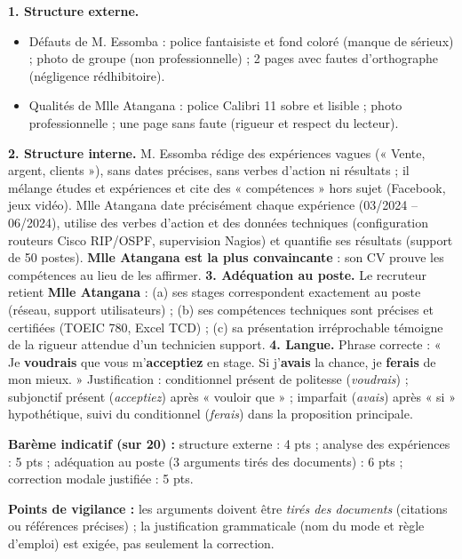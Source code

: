 \documentclass[11pt]{article}
\begin{document}
\begin{corrige}
\textbf{1. Structure externe.}
\begin{itemize}
\item Défauts de M. Essomba : police fantaisiste et fond coloré (manque de sérieux) ; photo de groupe (non professionnelle) ; 2 pages avec fautes d'orthographe (négligence rédhibitoire).
\item Qualités de Mlle Atangana : police Calibri 11 sobre et lisible ; photo professionnelle ; une page sans faute (rigueur et respect du lecteur).
\end{itemize}
\textbf{2. Structure interne.} M. Essomba rédige des expériences vagues (« Vente, argent, clients »), sans dates précises, sans verbes d'action ni résultats ; il mélange études et expériences et cite des « compétences » hors sujet (Facebook, jeux vidéo). Mlle Atangana date précisément chaque expérience (03/2024 -- 06/2024), utilise des verbes d'action et des données techniques (configuration routeurs Cisco RIP/OSPF, supervision Nagios) et quantifie ses résultats (support de 50 postes). \textbf{Mlle Atangana est la plus convaincante} : son CV prouve les compétences au lieu de les affirmer.
\textbf{3. Adéquation au poste.} Le recruteur retient \textbf{Mlle Atangana} : (a) ses stages correspondent exactement au poste (réseau, support utilisateurs) ; (b) ses compétences techniques sont précises et certifiées (TOEIC 780, Excel TCD) ; (c) sa présentation irréprochable témoigne de la rigueur attendue d'un technicien support.
\textbf{4. Langue.} Phrase correcte : « Je \textbf{voudrais} que vous m'\textbf{acceptiez} en stage. Si j'\textbf{avais} la chance, je \textbf{ferais} de mon mieux. » Justification : conditionnel présent de politesse (\emph{voudrais}) ; subjonctif présent (\emph{acceptiez}) après « vouloir que » ; imparfait (\emph{avais}) après « si » hypothétique, suivi du conditionnel (\emph{ferais}) dans la proposition principale.

\textbf{Barème indicatif (sur 20) :} structure externe : 4 pts ; analyse des expériences : 5 pts ; adéquation au poste (3 arguments tirés des documents) : 6 pts ; correction modale justifiée : 5 pts.

\textbf{Points de vigilance :} les arguments doivent être \emph{tirés des documents} (citations ou références précises) ; la justification grammaticale (nom du mode et règle d'emploi) est exigée, pas seulement la correction.
\end{corrige}
\end{document}

